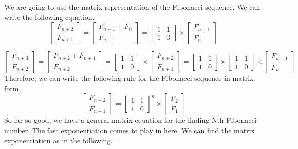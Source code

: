\documentclass[12pt]{article}
\begin{document}
We are going to use the matrix representation of the Fibonacci sequence. We can write the following equation. \cite{fibonaccimatrix}
\[
\begin{bmatrix}
    F_{n+2} \\
    F_{n+1}
\end{bmatrix}
=
\begin{bmatrix}
    F_{n+1} + F_{n}\\
    F_{n+1}
\end{bmatrix}
=
\begin{bmatrix}
    1 & 1  \\
    1 & 0
\end{bmatrix}
\times
\begin{bmatrix}
    F_{n+1} \\
    F_{n}
\end{bmatrix}
\]

\[
\begin{bmatrix}
    F_{n+3}\\
    F_{n+2}
\end{bmatrix}
= 
\begin{bmatrix}
    F_{n+2} + F_{n+1}\\
    F_{n+2}
\end{bmatrix}
=
\begin{bmatrix} 
    1 & 1  \\
    1 & 0
\end{bmatrix}
\times
\begin{bmatrix}
    F_{n+2} \\
    F_{n+1}
\end{bmatrix}
=
\begin{bmatrix} 
    1 & 1  \\
    1 & 0
\end{bmatrix}
\times
\begin{bmatrix} 
    1 & 1  \\
    1 & 0
\end{bmatrix}
\times
\begin{bmatrix}
    F_{n+1} \\
    F_{n}
\end{bmatrix}
\]
Therefore, we can write the following rule for the Fibonacci sequence in matrix form,
\[ \begin{bmatrix}
    F_{n+2}\\
    F_{n+1}
\end{bmatrix}
=
\begin{bmatrix}
    1 & 1  \\
    1 & 0
\end{bmatrix}^{n}
\times
\begin{bmatrix}
    F_2 \\
    F_1
\end{bmatrix} \]
So far so good, we have a general matrix equation for the finding Nth Fibonacci number. The fast exponentiation comes to play in here. We can find the matrix exponentiation as in the following.
\end{document}
